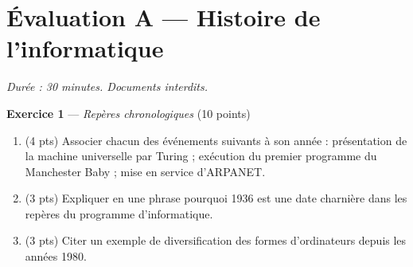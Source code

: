 \section*{Évaluation A --- Histoire de l'informatique}
\textit{Durée : 30 minutes. Documents interdits.}


\bigskip

\textbf{Exercice 1} --- \textit{Repères chronologiques} \hfill (10 points)

\begin{enumerate}
  \item (4 pts) Associer chacun des événements suivants à son année :
    présentation de la machine universelle par Turing ; exécution du premier
    programme du Manchester Baby ; mise en service d'ARPANET.
  \item (3 pts) Expliquer en une phrase pourquoi 1936 est une date charnière
    dans les repères du programme d'informatique.
  \item (3 pts) Citer un exemple de diversification des formes d'ordinateurs
    depuis les années 1980.
\end{enumerate}

\bigskip

